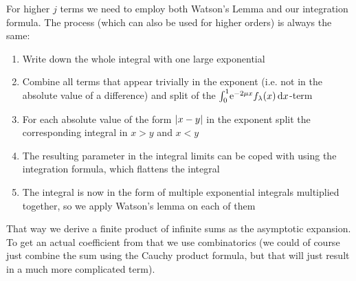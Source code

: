 For higher $j$ terms we need to employ both Watson's Lemma and our integration
formula. The process (which can also be used for higher orders) is always the
same:
\begin{enumerate}
  \item Write down the whole integral with one large exponential
  \item Combine all terms that appear trivially in the exponent (i.e. not in the
    absolute value of a difference) and split of the $\Int{x}{\Eto{-2\mu
    x}f_\lambda(x)}$-term
  \item For each absolute value of the form $\Abs{x-y}$ in the exponent split
    the corresponding integral in $x > y$ and $x < y$
  \item The resulting parameter in the integral limits can be coped with using
    the integration formula, which flattens the integral
  \item The integral is now in the form of multiple exponential integrals
    multiplied together, so we apply Watson's lemma on each of them
\end{enumerate}
That way we derive a finite product of infinite sums as the asymptotic
expansion. To get an actual coefficient from that we use combinatorics (we could
of course just combine the sum using the Cauchy product formula, but that will
just result in a much more complicated term).

